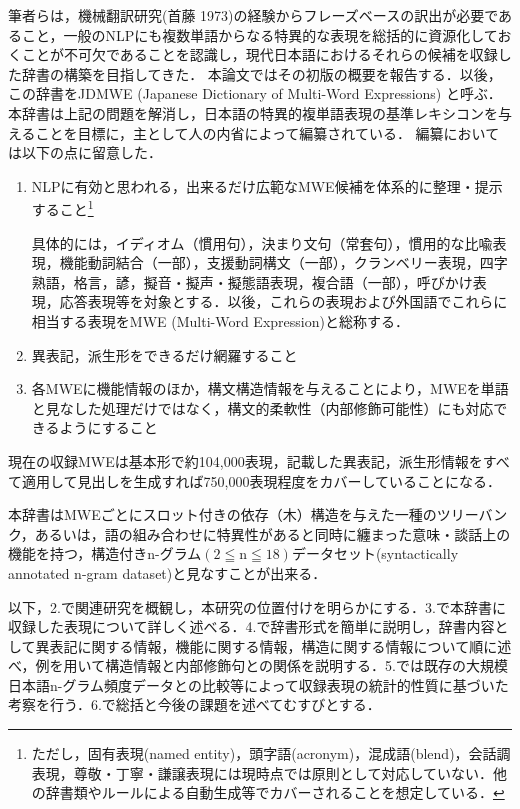 \documentclass[japanese]{jnlp_1.4}
\begin{document}
筆者らは，機械翻訳研究(首藤 1973)の経験からフレーズベースの訳出が必要であること，一般のNLPにも複数単語からなる特異的な表現を総括的に資源化しておくことが不可欠であることを認識し，現代日本語におけるそれらの候補を収録した辞書の構築を目指してきた．
本論文ではその初版の概要を報告する．以後，この辞書をJDMWE (Japanese Dictionary of Multi-Word Expressions) と呼ぶ．
本辞書は上記の問題を解消し，日本語の特異的複単語表現の基準レキシコンを与えることを目標に，主として人の内省によって編纂されている．
編纂においては以下の点に留意した．
\begin{enumerate}
\item NLPに有効と思われる，出来るだけ広範なMWE候補を体系的に整理・提示すること\footnote{ただし，固有表現(named entity)，頭字語(acronym)，混成語(blend)，会話調表現，尊敬・丁寧・謙譲表現には現時点では原則として対応していない．他の辞書類やルールによる自動生成等でカバーされることを想定している．}

具体的には，イディオム（慣用句），決まり文句（常套句），慣用的な比喩表現，機能動詞結合（一部），支援動詞構文（一部），クランベリー表現，四字熟語，格言，諺，擬音・擬声・擬態語表現，複合語（一部），呼びかけ表現，応答表現等を対象とする．以後，これらの表現および外国語でこれらに相当する表現をMWE (Multi-Word Expression)と総称する．
\item 異表記，派生形をできるだけ網羅すること
\item 各MWEに機能情報のほか，構文構造情報を与えることにより，MWEを単語と見なした処理だけではなく，構文的柔軟性（内部修飾可能性）にも対応できるようにすること
\end{enumerate}

現在の収録MWEは基本形で約104,000表現，記載した異表記，派生形情報をすべて適用して見出しを生成すれば750,000表現程度をカバーしていることになる．

本辞書はMWEごとにスロット付きの依存（木）構造を与えた一種のツリーバンク，あるいは，語の組み合わせに特異性があると同時に纏まった意味・談話上の機能を持つ，構造付きn-グラム$(2 \leqq\mathrm{n}\leqq 18)$データセット(syntactically annotated n-gram dataset)と見なすことが出来る．

以下，2.で関連研究を概観し，本研究の位置付けを明らかにする．3.で本辞書に収録した表現について詳しく述べる．4.で辞書形式を簡単に説明し，辞書内容として異表記に関する情報，機能に関する情報，構造に関する情報について順に述べ，例を用いて構造情報と内部修飾句との関係を説明する．5.では既存の大規模日本語n-グラム頻度データとの比較等によって収録表現の統計的性質に基づいた考察を行う．6.で総括と今後の課題を述べてむすびとする．
\end{document}
